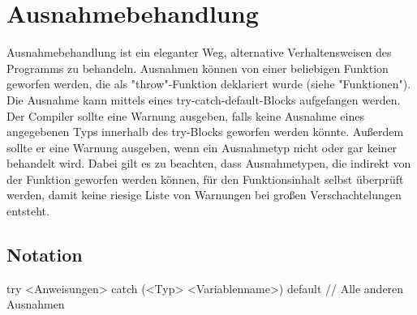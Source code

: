 \chapter{Ausnahmebehandlung}
Ausnahmebehandlung ist ein eleganter Weg, alternative Verhaltensweisen des Programms zu behandeln.
Ausnahmen können von einer beliebigen Funktion geworfen werden, die als "throw"-Funktion deklariert wurde (siehe "Funktionen").
Die Ausnahme kann mittels eines try-catch-default-Blocks aufgefangen werden.
Der Compiler sollte eine Warnung ausgeben, falls keine Ausnahme eines angegebenen Typs innerhalb des try-Blocks geworfen werden
könnte.
Außerdem sollte er eine Warnung ausgeben, wenn ein Ausnahmetyp nicht oder gar keiner behandelt wird. Dabei gilt es zu beachten, dass
Ausnahmetypen, die indirekt von der Funktion geworfen werden können, für den Funktionsinhalt selbst überprüft werden, damit keine
riesige Liste von Warnungen bei großen Verschachtelungen entsteht.

\section{Notation}
try
{
	<Anweisungen>
}
catch (<Typ> <Variablenname>)
{
}
default // Alle anderen Ausnahmen
{
}